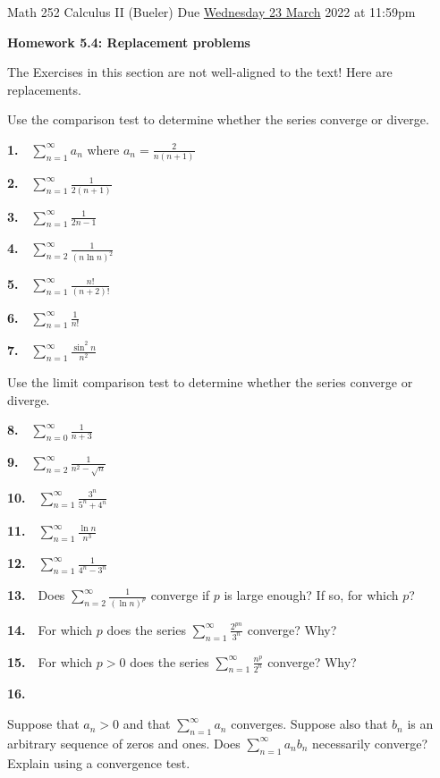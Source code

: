 \documentclass[12pt]{amsart}
\newcommand{\ds}{\displaystyle}
\begin{document}
\scriptsize \noindent Math 252 Calculus II (Bueler) \hfill Due \underline{Wednesday 23 March} 2022 at 11:59pm
\normalsize

\Large
\bigskip
\centerline{\textbf{Homework 5.4: Replacement problems}}
\medskip
\normalsize

\thispagestyle{empty}

\bigskip

The Exercises in this section are not well-aligned to the text!  Here are replacements.

\bigskip
\noindent Use the comparison test to determine whether the series converge or diverge.

\newcommand{\pr}[1]{\bigskip \textbf{#1.} \,\,}

\pr{1} $\ds \sum_{n=1}^\infty a_n$ where $\ds a_n = \frac{2}{n(n+1)}$

\pr{2} $\ds \sum_{n=1}^\infty \frac{1}{2(n+1)}$

\pr{3} $\ds \sum_{n=1}^\infty \frac{1}{2n - 1}$

\pr{4} $\ds \sum_{n=2}^\infty \frac{1}{(n\ln n)^2}$

\pr{5} $\ds \sum_{n=1}^\infty \frac{n!}{(n+2)!}$

\pr{6} $\ds \sum_{n=1}^\infty \frac{1}{n!}$

\pr{7} $\ds \sum_{n=1}^\infty \frac{\sin^2 n}{n^2}$

\bigskip
\noindent Use the limit comparison test to determine whether the series converge or diverge.

\pr{8} $\ds \sum_{n=0}^\infty \frac{1}{n+3}$

\pr{9} $\ds \sum_{n=2}^\infty \frac{1}{n^2 - \sqrt{n}}$

\pr{10} $\ds \sum_{n=1}^\infty \frac{3^n}{5^n + 4^n}$

\pr{11} $\ds \sum_{n=1}^\infty \frac{\ln n}{n^3}$

\pr{12} $\ds \sum_{n=1}^\infty \frac{1}{4^n - 3^n}$

\bigskip
\pr{13} Does $\ds \sum_{n=2}^\infty \frac{1}{(\ln n)^p}$ converge if $p$ is large enough?  If so, for which $p$?

\pr{14} For which $p$ does the series $\ds \sum_{n=1}^\infty \frac{2^{pn}}{3^n}$ converge?  Why?

\pr{15} For which $p>0$ does the series $\ds \sum_{n=1}^\infty \frac{n^p}{2^n}$ converge?  Why?

\pr{16} \begin{minipage}[t]{5.5in} Suppose that $a_n>0$ and that $\ds \sum_{n=1}^\infty a_n$ converges.  Suppose also that $b_n$ is an arbitrary sequence of zeros and ones. Does $\ds \sum_{n=1}^\infty a_n b_n$ necessarily converge?  Explain using a convergence test. \end{minipage}
\end{document}

